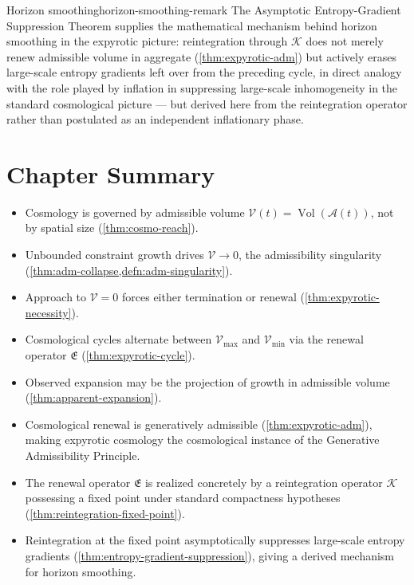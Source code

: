 \documentclass[12pt,twoside,openright]{book}
\newcommand{\Vol}{\operatorname{Vol}}
\newenvironment{chapsummary}{%
  \begin{tcolorbox}[colback=DistBlue!5,colframe=DistBlue,
    title={\faBookOpen\enspace Summary},
    fonttitle=\sffamily\bfseries\color{white},
    attach boxed title to top left={yshift=-2mm,xshift=4mm},
    boxed title style={colback=DistBlue,rounded corners}]
  \begin{itemize}[nosep,leftmargin=*]}{%
  \end{itemize}\end{tcolorbox}}
\begin{document}
\begin{remark}{Horizon smoothing}{horizon-smoothing-remark}
  The Asymptotic Entropy-Gradient Suppression Theorem
  supplies the mathematical mechanism behind horizon
  smoothing in the expyrotic picture: reintegration through
  $\mathcal{K}$ does not merely renew admissible volume in
  aggregate (\cref{thm:expyrotic-adm}) but actively erases
  large-scale entropy gradients left over from the
  preceding cycle, in direct analogy with the role played by
  inflation in suppressing large-scale inhomogeneity in the
  standard cosmological picture --- but derived here from
  the reintegration operator rather than postulated as an
  independent inflationary phase.
\end{remark}

\section*{Chapter Summary}
\begin{chapsummary}
  \item Cosmology is governed by admissible volume
        $\mathcal{V}(t) = \Vol(\mathcal{A}(t))$, not by
        spatial size (\cref{thm:cosmo-reach}).
  \item Unbounded constraint growth drives
        $\mathcal{V} \to 0$, the admissibility singularity
        (\cref{thm:adm-collapse,defn:adm-singularity}).
  \item Approach to $\mathcal{V} = 0$ forces either
        termination or renewal
        (\cref{thm:expyrotic-necessity}).
  \item Cosmological cycles alternate between
        $\mathcal{V}_{\max}$ and $\mathcal{V}_{\min}$ via
        the renewal operator $\mathfrak{E}$
        (\cref{thm:expyrotic-cycle}).
  \item Observed expansion may be the projection of growth
        in admissible volume
        (\cref{thm:apparent-expansion}).
  \item Cosmological renewal is generatively admissible
        (\cref{thm:expyrotic-adm}), making expyrotic
        cosmology the cosmological instance of the
        Generative Admissibility Principle.
  \item The renewal operator $\mathfrak{E}$ is realized
        concretely by a reintegration operator $\mathcal{K}$
        possessing a fixed point under standard compactness
        hypotheses (\cref{thm:reintegration-fixed-point}).
  \item Reintegration at the fixed point asymptotically
        suppresses large-scale entropy gradients
        (\cref{thm:entropy-gradient-suppression}), giving a
        derived mechanism for horizon smoothing.
\end{chapsummary}
\end{document}
